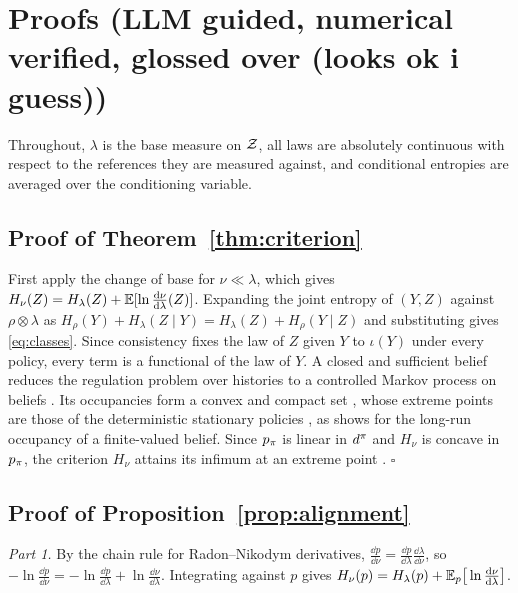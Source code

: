 \section{Proofs (LLM guided, numerical verified, glossed over (looks ok i guess))}
\label{sup:proofs}

Throughout, $\lambda$ is the base measure on $\mathcal Z$, all laws are absolutely continuous with respect to the references they are measured against, and conditional entropies are averaged over the conditioning variable.

\subsection{Proof of Theorem~\ref{thm:criterion}}
\label{sup:proof-criterion}
First apply the change of base for $\nu \ll \lambda$, which gives $H_\nu(Z) = H_\lambda(Z) + \mathbb E[\ln \tfrac{\mathrm d\nu}{\mathrm d\lambda}(Z)]$.
Expanding the joint entropy of $(Y, Z)$ against $\rho \otimes \lambda$ as $H_\rho(Y) + H_\lambda(Z \mid Y) = H_\lambda(Z) + H_\rho(Y \mid Z)$ and substituting gives \eqref{eq:classes}.
Since consistency fixes the law of $Z$ given $Y$ to $\iota(Y)$ under every policy, every term is a functional of the law of $Y$.
A closed and sufficient belief reduces the regulation problem over histories to a controlled Markov process on beliefs \citep{Kaelbling-planning98}.
Its occupancies form a convex and compact set \citep[Remark~6]{Feinberg-constrained20}, whose extreme points are those of the deterministic stationary policies \citep[Theorem~1]{Piunovskiy-extreme24}, as \citet[Ch.~7, p.~94]{Derman-finite70ch7} shows for the long-run occupancy of a finite-valued belief.
Since $p_{\pi}$ is linear in $d^{\pi}$ and $H_\nu$ is concave in $p_{\pi}$, the criterion $H_\nu$ attains its infimum at an extreme point \citep{Bauer-minimalstellen58}.
\hfill$\square$

\subsection{Proof of Proposition~\ref{prop:alignment}}
\label{sup:proof-alignment}
\emph{Part 1.}
By the chain rule for Radon--Nikodym derivatives, $\tfrac{\dd p}{\dd\nu} = \tfrac{\dd p}{\dd\lambda} \tfrac{\dd\lambda}{\dd\nu}$, so $-\ln \tfrac{\dd p}{\dd\nu} = -\ln \tfrac{\dd p}{\dd\lambda} + \ln \tfrac{\dd\nu}{\dd\lambda}$.
Integrating against $p$ gives $H_\nu(p) = H_\lambda(p) + \mathbb E_p\big[\ln \tfrac{\mathrm d\nu}{\mathrm d\lambda}\big]$.

